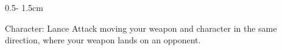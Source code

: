\documentclass{uioposter}
\begin{document}
\begin{frame}
\begin{columns}[onlytextwidth]
\begin{column}{0.5\textwidth - 1.5cm}
    \begin{exampleblock}{Character: Lance}
        Attack moving your weapon and character in the same direction, where your weapon lands on an opponent.
    \end{exampleblock}

\end{column}


\end{columns}


\end{frame}
\end{document}
